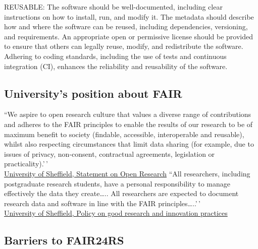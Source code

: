 \documentclass[
  letterpaper,
  DIV=11,
  numbers=noendperiod]{scrartcl}
\begin{document}
REUSABLE: The software should be well-documented, including clear
instructions on how to install, run, and modify it. The metadata should
describe how and where the software can be reused, including
dependencies, versioning, and requirements. An appropriate open or
permissive license should be provided to ensure that others can legally
reuse, modify, and redistribute the software. Adhering to coding
standards, including the use of tests and continuous integration (CI),
enhances the reliability and reusability of the software.

\subsection{University's position about
FAIR}\label{universitys-position-about-fair}

``We aspire to open research culture that values a diverse range of
contributions and adheres to the FAIR principles to enable the results
of our research to be of maximum benefit to society (findable,
accessible, interoperable and reusable), whilst also respecting
circumstances that limit data sharing (for example, due to issues of
privacy, non-consent, contractual agreements, legislation or
practicality).'\,'\\
\href{https://www.sheffield.ac.uk/openresearch/university-statement-open-research}{University
of Sheffield, Statement on Open Research} ``All researchers, including
postgraduate research students, have a personal responsibility to manage
effectively the data they create\ldots.. All researchers are expected to
document research data and software in line with the FAIR
principles\ldots..'\,'\\
\href{https://www.sheffield.ac.uk/media/18953/download}{University of
Sheffield, Policy on good research and innovation practices}

\subsection{Barriers to FAIR24RS}\label{barriers-to-fair24rs}
\end{document}

